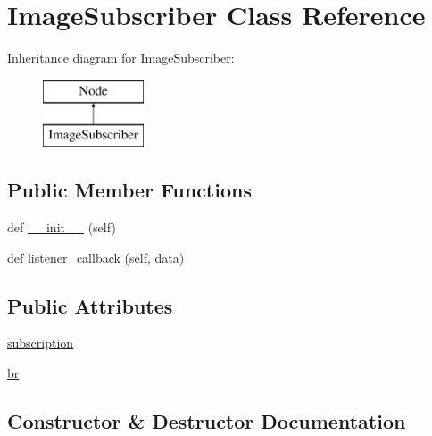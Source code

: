 \hypertarget{classtoxic__vision_1_1webcam__sub_1_1ImageSubscriber}{}\section{Image\+Subscriber Class Reference}
\label{classtoxic__vision_1_1webcam__sub_1_1ImageSubscriber}
Inheritance diagram for Image\+Subscriber\+:\begin{figure}[H]
\begin{center}
\leavevmode
\includegraphics[height=2.000000cm]{db/dd5/classtoxic__vision_1_1webcam__sub_1_1ImageSubscriber}
\end{center}
\end{figure}
\subsection*{Public Member Functions}
\begin{DoxyCompactItemize}
\item 
def \mbox{\hyperlink{classtoxic__vision_1_1webcam__sub_1_1ImageSubscriber_ae64f0875afe3067b97ba370b354b9213}{\+\_\+\+\_\+init\+\_\+\+\_\+}} (self)
\item 
def \mbox{\hyperlink{classtoxic__vision_1_1webcam__sub_1_1ImageSubscriber_a23dd9943cb7cb7be2a6e7022a85a1684}{listener\+\_\+callback}} (self, data)
\end{DoxyCompactItemize}
\subsection*{Public Attributes}
\begin{DoxyCompactItemize}
\item 
\mbox{\hyperlink{classtoxic__vision_1_1webcam__sub_1_1ImageSubscriber_a4b0698733c4dfaffe8e2b4cd952b6f82}{subscription}}
\item 
\mbox{\hyperlink{classtoxic__vision_1_1webcam__sub_1_1ImageSubscriber_a88f0860257ba6bdc089557444f5cdd16}{br}}
\end{DoxyCompactItemize}


\subsection{Constructor \& Destructor Documentation}
\mbox{\label{classtoxic__vision_1_1webcam__sub_1_1ImageSubscriber_ae64f0875afe3067b97ba370b354b9213}} 
